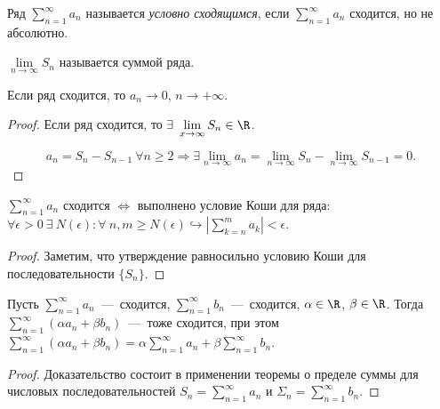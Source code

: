 \begin{definition}
    Ряд $\sum_{n = 1}^{\infty} a_n$ называется \textit{условно сходящимся}, если $\sum_{n = 1}^{\infty} a_n$ сходится, но не абсолютно. 
\end{definition}

\begin{definition}
    $\lim \limits_{n\rightarrow \infty}S_n$ называется суммой ряда.
\end{definition}

\begin{theorem}
    Если ряд сходится, то $a_n \rightarrow 0$, $n \rightarrow +\infty$.
\end{theorem}

\begin{proof}
    Если ряд сходится, то $\exists \ \lim \limits_{x\rightarrow \infty} S_n \in \R$.
    
$$a_n = S_n - S_{n - 1} \ \forall n \geq 2 \Rightarrow \exists \lim \limits_{n \rightarrow \infty} a_n = \lim \limits_{n\rightarrow \infty}S_n - \lim\limits_{n \rightarrow \infty}S_{n - 1} = 0.$$
\end{proof}

\begin{theorem}
    $\sum_{n = 1}^{\infty} a_n$ сходится $\Leftrightarrow$ выполнено условие Коши для ряда: $\forall \epsilon > 0 \ \exists \ N(\epsilon) : \forall \ n, m \ge N(\epsilon) \hookrightarrow \left | \sum_{k = n}^{m} a_k \right | < \epsilon$.
\end{theorem}

\begin{proof}
    Заметим, что утверждение равносильно условию Коши для последовательности $\{ S_n\}$.
\end{proof}

\begin{theorem}
    Пусть $\sum_{n = 1}^{\infty} a_n$~---~сходится, $\sum_{n = 1}^{\infty} b_n$~---~сходится, $\alpha \in \R$, $\beta \in \R$. Тогда $\sum_{n = 1}^{\infty} (\alpha a_n + \beta b_n) $~---~тоже сходится, при этом $\sum_{n = 1}^{\infty} (\alpha a_n + \beta b_n) = \alpha \sum_{n = 1}^{\infty} a_n + \beta \sum_{n = 1}^{\infty} b_n$.
\end{theorem}

\begin{proof}
    Доказательство состоит в применении теоремы о пределе суммы для числовых последовательностей $S_n = \sum_{n = 1}^{\infty} a_n$ и $\Sigma_n = \sum_{n = 1}^{\infty} b_n$.
\end{proof}

